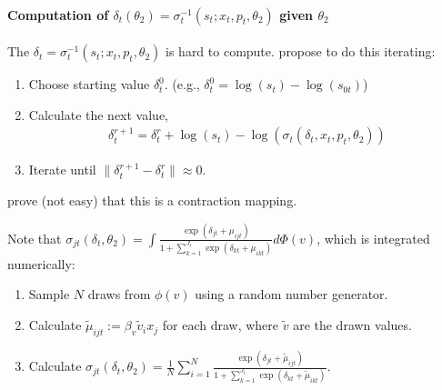 \documentclass[11pt]{elegantbook}
\begin{document}
\paragraph*{Computation of $\delta_t(\theta_2)=\sigma_{t}^{-1}\left(s_t; x_t,p_t,\theta_2\right)$ given $\theta_2$}
The $\delta_t=\sigma_{t}^{-1}\left(s_t; x_t,p_t,\theta_2\right)$ is hard to compute. \cite{berry1995automobile} propose to do this iterating:
\begin{enumerate}
    \item Choose starting value $\delta_t^0$. (e.g., $\delta_t^0=\log(s_t)-\log(s_{0t})$)
    \item Calculate the next value,
    \begin{equation}
        \begin{aligned}
            \delta_t^{r+1}=\delta_t^r+\log\left(s_t\right)-\log\left(\sigma_{t}\left(\delta_t,x_t,p_t,\theta_2\right)\right)
        \end{aligned}
        \nonumber
    \end{equation}
    \item Iterate until $\|\delta_t^{r+1}-\delta_t^r\|\approx 0$.
\end{enumerate}
\cite{berry1995automobile} prove (not easy) that this is a contraction mapping.

Note that $\sigma_{jt}\left(\delta_t,\theta_2\right)=\int \frac{\exp(\delta_{jt}+\mu_{ijt})}{1+\sum_{k=1}^{J_t}\exp(\delta_{kt}+\mu_{ikt})}d \Phi(v)$, which is integrated numerically:
\begin{enumerate}
    \item Sample $N$ draws from $\phi(v)$ using a random number generator.
    \item Calculate $\tilde{\mu}_{ijt}:=\beta_v\tilde{v}_i x_j$ for each draw, where $\tilde{v}$ are the drawn values.
    \item Calculate $\sigma_{jt}(\delta_t,\theta_2)=\frac{1}{N}\sum_{i=1}^N\frac{\exp(\delta_{jt}+\tilde{\mu}_{ijt})}{1+\sum_{k=1}^{J_t}\exp(\delta_{kt}+\tilde{\mu}_{ikt})}$.
\end{enumerate}
\end{document}
